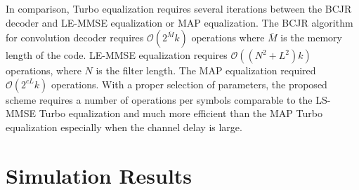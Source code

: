 \documentclass[conference]{IEEEtran}
\begin{document}
In comparison,  Turbo equalization requires several iterations between the BCJR \cite{1055186} decoder and LE-MMSE equalization or MAP equalization. The BCJR algorithm for convolution decoder requires $\mathcal{O}(2^{\overline{M}}k)$ operations where $\overline{M}$ is the memory length of the code. LE-MMSE equalization requires $\mathcal{O}((N^2+L^2)k)$ operations, where $N$ is the filter length. The MAP equalization required $\mathcal{O}(2^{cL}k)$ operations. 
%
%
%
%
With a proper selection of parameters, the proposed scheme requires a  number of operations per symbols comparable to the LS-MMSE Turbo equalization and much more efficient than the MAP Turbo equalization especially when the channel delay is large. 
\section{Simulation Results} \label{sec:results}
\end{document}
